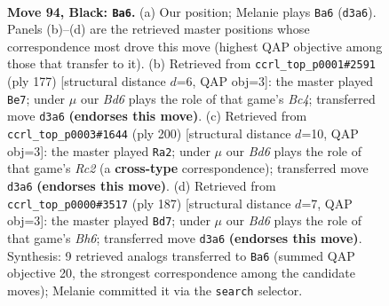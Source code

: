 \documentclass[11pt]{article}
\begin{document}
\clearpage

\begin{figure}[p]\centering
\begin{subfigure}{0.46\textwidth}\centering
\resizebox{\linewidth}{!}{%
\newchessgame
\chessboard[
  setfen={8/8/5k2/5p2/5P1K/3b4/8/8 b - - 3 94},
  showmover=false,
  pgfstyle=straightmove, color=movearrow, markmove={d3-a6}
]}
\caption{}
\end{subfigure}\hfill
\begin{subfigure}{0.46\textwidth}\centering
\resizebox{\linewidth}{!}{%
\newchessgame
\chessboard[
  setfen={1R6/8/5k2/2b2p1K/5P2/8/8/8 b - - 71 89},
  showmover=false,
  pgfstyle=straightmove, color=movearrow, markmove={c5-e7}
]}
\caption{}
\end{subfigure}
\\[4pt]
\begin{subfigure}{0.46\textwidth}\centering
\resizebox{\linewidth}{!}{%
\newchessgame
\chessboard[
  setfen={8/5p1k/8/5KP1/8/8/2R5/b7 w - - 55 101},
  showmover=false,
  pgfstyle=straightmove, color=movearrow, markmove={c2-a2}
]}
\caption{}
\end{subfigure}\hfill
\begin{subfigure}{0.46\textwidth}\centering
\resizebox{\linewidth}{!}{%
\newchessgame
\chessboard[
  setfen={8/8/7k/7p/7P/4K2b/8/4N3 b - - 19 94},
  showmover=false,
  pgfstyle=straightmove, color=movearrow, markmove={h3-d7}
]}
\caption{}
\end{subfigure}
\caption{\textbf{Move 94, Black: \texttt{Ba6}.} (a) Our position; Melanie plays \texttt{Ba6} (\texttt{d3a6}). Panels (b)--(d) are the retrieved master positions whose correspondence most drove this move (highest QAP objective among those that transfer to it). (b) Retrieved from \texttt{ccrl\_top\_p0001\#2591} (ply 177) [structural distance $d$=6, QAP obj=3]: the master played \texttt{Be7}; under $\mu$ our \emph{Bd6} plays the role of that game's \emph{Bc4}; transferred move \texttt{d3a6} \textbf{(endorses this move)}. (c) Retrieved from \texttt{ccrl\_top\_p0003\#1644} (ply 200) [structural distance $d$=10, QAP obj=3]: the master played \texttt{Ra2}; under $\mu$ our \emph{Bd6} plays the role of that game's \emph{Rc2} (a \textbf{cross-type} correspondence); transferred move \texttt{d3a6} \textbf{(endorses this move)}. (d) Retrieved from \texttt{ccrl\_top\_p0000\#3517} (ply 187) [structural distance $d$=7, QAP obj=3]: the master played \texttt{Bd7}; under $\mu$ our \emph{Bd6} plays the role of that game's \emph{Bh6}; transferred move \texttt{d3a6} \textbf{(endorses this move)}. Synthesis: 9 retrieved analogs transferred to \texttt{Ba6} (summed QAP objective 20, the strongest correspondence among the candidate moves); Melanie committed it via the \texttt{search} selector.}
\label{fig:thought-m187}
\end{figure}
\end{document}
